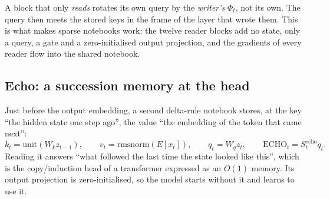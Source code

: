 \documentclass[11pt]{article}
\begin{document}
A block that only \emph{reads} rotates its own query by the \emph{writer's} $\Phi_t$, not its own. The query then meets the stored keys in the frame of the layer that wrote them. This is what makes sparse notebooks work: the twelve reader blocks add no state, only a query, a gate and a zero-initialised output projection, and the gradients of every reader flow into the shared notebook.

\subsection{Echo: a succession memory at the head}
\label{sec:echo}
Just before the output embedding, a second delta-rule notebook stores, at the key ``the hidden state one step ago'', the value ``the embedding of the token that came next'':
\begin{equation}
k_t = \mathrm{unit}(W_k z_{t-1}),\qquad v_t = \mathrm{rmsnorm}(E[x_t]),\qquad q_t = W_q z_t,\qquad \mathrm{ECHO}_t = S^{\mathrm{echo}}_t q_t .
\end{equation}
Reading it answers ``what followed the last time the state looked like this'', which is the copy/induction head of a transformer expressed as an $O(1)$ memory. Its output projection is zero-initialised, so the model starts without it and learns to use it.
\end{document}
